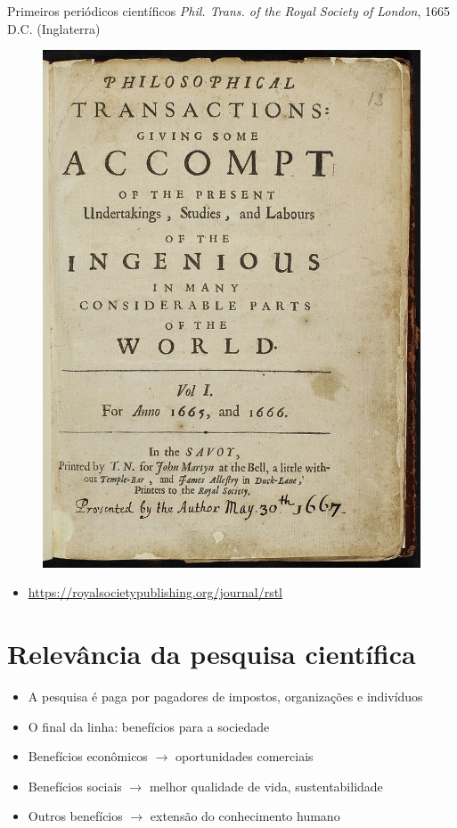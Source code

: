 \begin{frame}{Primeiros periódicos científicos}
\textit{Phil. Trans. of the Royal Society of London}, 1665 D.C. (Inglaterra)
\begin{figure}
\centering
\includegraphics[scale=0.8]{figs/01/ptrslondon}
\end{figure}
\begin{itemize}
\item \small{\url{https://royalsocietypublishing.org/journal/rstl} }
\end{itemize}
\end{frame}

\section{Relevância da pesquisa científica}

\begin{frame}
\begin{itemize}
\item A pesquisa é paga por pagadores de impostos, organizações e indivíduos
\item O final da linha: benefícios para a sociedade
\item Benefícios econômicos $\rightarrow$ oportunidades comerciais
\item Benefícios sociais $\rightarrow$ melhor qualidade de vida, sustentabilidade
\item Outros benefícios $\rightarrow$ extensão do conhecimento humano
\end{itemize}
\end{frame}

